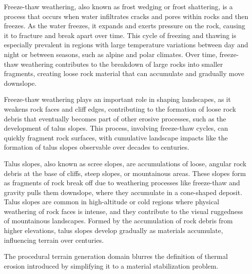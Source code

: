 
Freeze-thaw weathering, also known as frost wedging or frost shattering, is a process that occurs when water infiltrates cracks and pores within rocks and then freezes. As the water freezes, it expands and exerts pressure on the rock, causing it to fracture and break apart over time. This cycle of freezing and thawing is especially prevalent in regions with large temperature variations between day and night or between seasons, such as alpine and polar climates. Over time, freeze-thaw weathering contributes to the breakdown of large rocks into smaller fragments, creating loose rock material that can accumulate and gradually move downslope.

Freeze-thaw weathering plays an important role in shaping landscapes, as it weakens rock faces and cliff edges, contributing to the formation of loose rock debris that eventually becomes part of other erosive processes, such as the development of talus slopes. This process, involving freeze-thaw cycles, can quickly fragment rock surfaces, with cumulative landscape impacts like the formation of talus slopes observable over decades to centuries.


Talus slopes, also known as scree slopes, are accumulations of loose, angular rock debris at the base of cliffs, steep slopes, or mountainous areas. These slopes form as fragments of rock break off due to weathering processes like freeze-thaw and gravity pulls them downslope, where they accumulate in a cone-shaped deposit. Talus slopes are common in high-altitude or cold regions where physical weathering of rock faces is intense, and they contribute to the visual ruggedness of mountainous landscapes. Formed by the accumulation of rock debris from higher elevations, talus slopes develop gradually as materials accumulate, influencing terrain over centuries.

The procedural terrain generation domain blurres the definition of thermal erosion introduced by \cite{Musgrave1989} simplifying it to a material stabilization problem. 

